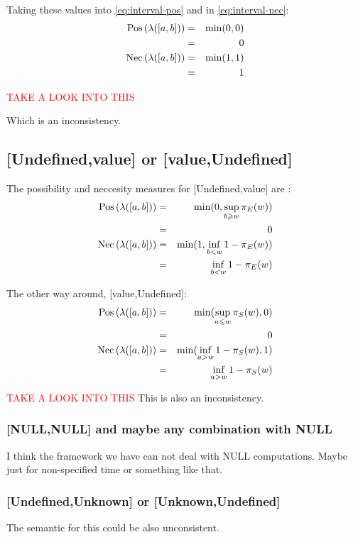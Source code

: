 Taking these values into  \eqref{eq:interval-pos} and in \eqref{eq:interval-nec}:
\begin{eqnarray}
\operatorname{Pos}\left(\lambda([a,b])\right)&=&\min (0,0)\\
 &=& 0\\
\operatorname{Nec}\left(\lambda([a,b])\right)&=&\min (1,1)\\
&=& 1
\end{eqnarray}

\textcolor{red}{TAKE A LOOK INTO THIS}

Which is an inconsistency.

\subsection{[Undefined,value] or [value,Undefined]}

The possibility and neccesity measures for [Undefined,value] are :
\begin{eqnarray}
\operatorname{Pos}\left(\lambda([a,b])\right)&=&\min (0,\sup_{b\geqslant w}\pi_{E}(w))\\
 &=& 0\\
\operatorname{Nec}\left(\lambda([a,b])\right)&=&\min (1,\inf_{b<w}1-\pi_{E}(w))\\
&=& \inf_{b<w}1-\pi_{E}(w)
\end{eqnarray}

The other way around, [value,Undefined]:
\begin{eqnarray}
\operatorname{Pos}\left(\lambda([a,b])\right)&=&\min (\sup_{a\leqslant w}\pi_{S}(w),0)\\
 &=& 0\\
\operatorname{Nec}\left(\lambda([a,b])\right)&=&\min (\inf_{a>w}1-\pi_{S}(w),1)\\
&=& \inf_{a>w}1-\pi_{S}(w)
\end{eqnarray}

\textcolor{red}{TAKE A LOOK INTO THIS}
This is also an inconsistency.

\subsubsection{[NULL,NULL] and maybe any combination with NULL}
I think the framework we have can not deal with NULL computations. Maybe just for non-specified time or something like that.

\subsubsection{[Undefined,Unknown] or [Unknown,Undefined]}
The semantic for this could be also unconsistent.


